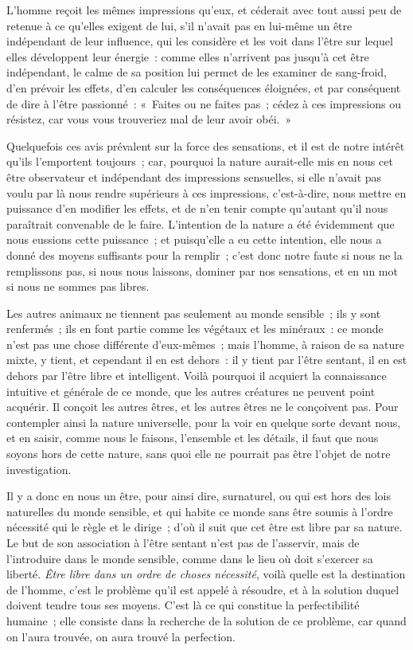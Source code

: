 \documentclass[french,twoside]{book} %
\begin{document}
L’homme reçoit les mêmes impressions qu’eux, et céderait avec tout aussi peu de retenue à ce qu’elles exigent de lui, s’il n’avait pas en lui-même un être indépendant de leur influence, qui les considère et les voit dans l’être sur lequel elles développent leur énergie : comme elles n’arrivent pas jusqu’à cet être indépendant, le calme de sa position lui permet de les examiner de sang-froid, d’en prévoir les effets, d’en calculer les conséquences éloignées, et par conséquent de dire à l’être passionné : « Faites ou ne faites pas ; cédez à ces impressions ou résistez, car vous vous trouveriez mal de leur avoir obéi. »\par
Quelquefois ces avis prévalent sur la force des sensations, et il est de notre intérêt qu’ils l’emportent toujours ; car, pourquoi la nature aurait-elle mis en nous cet être observateur et indépendant des impressions sensuelles, si elle n’avait pas voulu par là nous rendre supérieurs à ces impressions, c’est-à-dire, nous mettre en puissance d’en modifier les effets, et de n’en tenir compte qu’autant qu’il nous paraîtrait convenable de le faire. L’intention de la nature a été évidemment que nous eussions cette puissance ; et puisqu’elle a eu cette intention, elle nous a donné des moyens suffisants pour la remplir ; c’est donc notre faute si nous ne la remplissons pas, si nous nous laissons, dominer par nos sensations, et en un mot si nous ne sommes pas libres.\par
Les autres animaux ne tiennent pas seulement au monde sensible ; ils y sont renfermés ; ils en font partie comme les végétaux et les minéraux : ce monde n’est pas une chose différente d’eux-mêmes ; mais l’homme, à raison de sa nature mixte, y tient, et cependant il en est dehors : il y tient par l’être sentant, il en est dehors par l’être libre et intelligent. Voilà pourquoi il acquiert la connaissance intuitive et générale de ce monde, que les autres créatures ne peuvent point acquérir. Il conçoit les autres êtres, et les autres êtres ne le conçoivent pas. Pour contempler ainsi la nature universelle, pour la voir en quelque sorte devant nous, et en saisir, comme nous le faisons, l’ensemble et les détails, il faut que nous soyons hors de cette nature, sans quoi elle ne pourrait pas être l’objet de notre investigation.\par
Il y a donc en nous un être, pour ainsi dire, surnaturel, ou qui est hors des lois naturelles du monde sensible, et qui habite ce monde sans être soumis à l’ordre nécessité qui le règle et le dirige ; d’où il suit que cet être est libre par sa nature. Le but de son association à l’être sentant n’est pas de l’asservir, mais de l’introduire dans le monde sensible, comme dans le lieu où doit s’exercer sa liberté. {\itshape Être libre dans un ordre de choses nécessité}, voilà quelle est la destination de l’homme, c’est le problème qu’il est appelé à résoudre, et à la solution duquel doivent tendre tous ses moyens. C’est là ce qui constitue la perfectibilité humaine ; elle consiste dans la recherche de la solution de ce problème, car quand on l’aura trouvée, on aura trouvé la perfection.\par
\end{document}
